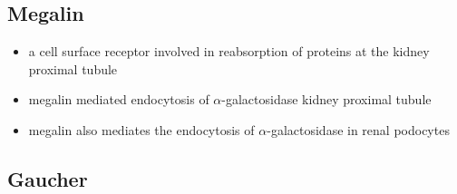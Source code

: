 \documentclass{scrartcl}
\begin{document}
\subsection{Megalin}
\label{sec:org9e8c774}
\begin{itemize}
\item a cell surface receptor involved in reabsorption of proteins at the kidney proximal tubule
\item megalin mediated endocytosis of \(\alpha\)-galactosidase kidney proximal tubule
\item megalin also mediates the endocytosis of \(\alpha\)-galactosidase in renal podocytes
\end{itemize}

\subsection{Gaucher}
\label{sec:orgdb3cb74}
\end{document}
